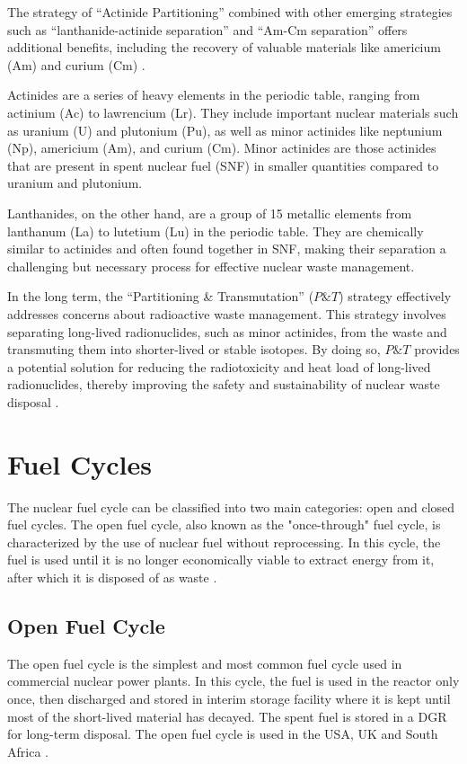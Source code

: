 The strategy of ``Actinide Partitioning'' combined with other emerging strategies such as ``lanthanide-actinide separation'' and ``Am-Cm separation'' offers additional benefits, including the recovery of valuable materials like americium (Am) and curium (Cm) \cite{fuel_cycle_book}.

Actinides are a series of heavy elements in the periodic table, ranging from actinium (Ac) to lawrencium (Lr). They include important nuclear materials such as uranium (U) and plutonium (Pu), as well as minor actinides like neptunium (Np), americium (Am), and curium (Cm). Minor actinides are those actinides that are present in spent nuclear fuel (SNF) in smaller quantities compared to uranium and plutonium.

Lanthanides, on the other hand, are a group of 15 metallic elements from lanthanum (La) to lutetium (Lu) in the periodic table. They are chemically similar to actinides and often found together in SNF, making their separation a challenging but necessary process for effective nuclear waste management.

In the long term, the ``Partitioning \& Transmutation'' (\(P\&T\)) strategy effectively addresses concerns about radioactive waste management. This strategy involves separating long-lived radionuclides, such as minor actinides, from the waste and transmuting them into shorter-lived or stable isotopes. By doing so, \(P\&T\) provides a potential solution for reducing the radiotoxicity and heat load of long-lived radionuclides, thereby improving the safety and sustainability of nuclear waste disposal \cite{fuel_cycle_book}.

\section{Fuel Cycles}

The nuclear fuel cycle can be classified into two main categories: open and closed fuel cycles. The open fuel cycle, also known as the "once-through" fuel cycle, is characterized by the use of nuclear fuel without reprocessing. In this cycle, the fuel is used until it is no longer economically viable to extract energy from it, after which it is disposed of as waste \cite{fuel_cycle_book}.

\subsection{Open Fuel Cycle}

The open fuel cycle is the simplest and most common fuel cycle used in commercial nuclear power plants. In this cycle, the fuel is used in the reactor only once, then discharged and stored in interim storage facility where it is kept until most of the short-lived material has decayed. The spent fuel is stored in a DGR for long-term disposal. The open fuel cycle is used in the USA, UK and South Africa \cite{fuel_cycle_book}.

